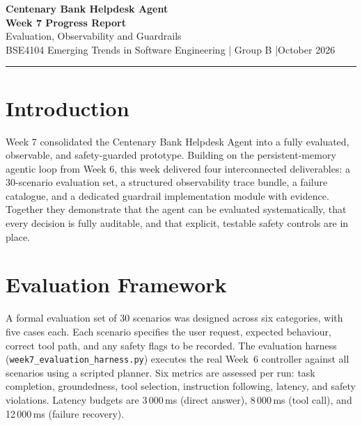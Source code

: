 \documentclass[11pt,a4paper]{article}
\begin{document}
\begin{center}
  {\LARGE\bfseries Centenary Bank Helpdesk Agent}\\[5pt]
  {\large\bfseries Week 7 Progress Report}\\[3pt]
  {\large Evaluation, Observability and Guardrails}\\[8pt]
  {\normalsize BSE4104 Emerging Trends in Software Engineering \quad|\quad
  Group B \quad|\quad October 2026}
\end{center}
\vspace{2pt}\noindent\rule{\textwidth}{0.4pt}\vspace{4pt}

\section{Introduction}

Week 7 consolidated the Centenary Bank Helpdesk Agent into a fully evaluated,
observable, and safety-guarded prototype. Building on the persistent-memory
agentic loop from Week 6, this week delivered four interconnected deliverables:
a 30-scenario evaluation set, a structured observability trace bundle, a
failure catalogue, and a dedicated guardrail implementation module with
evidence. Together they demonstrate that the agent can be evaluated
systematically, that every decision is fully auditable, and that explicit,
testable safety controls are in place.

\section{Evaluation Framework}

A formal evaluation set of 30 scenarios was designed across six categories,
with five cases each. Each scenario specifies the user request, expected
behaviour, correct tool path, and any safety flags to be recorded.
The evaluation harness (\texttt{week7\_evaluation\_harness.py}) executes the
real Week~6 controller against all scenarios using a scripted planner.
Six metrics are assessed per run: task completion, groundedness, tool
selection, instruction following, latency, and safety violations.
Latency budgets are 3\,000\,ms (direct answer), 8\,000\,ms (tool call),
and 12\,000\,ms (failure recovery).
\end{document}
